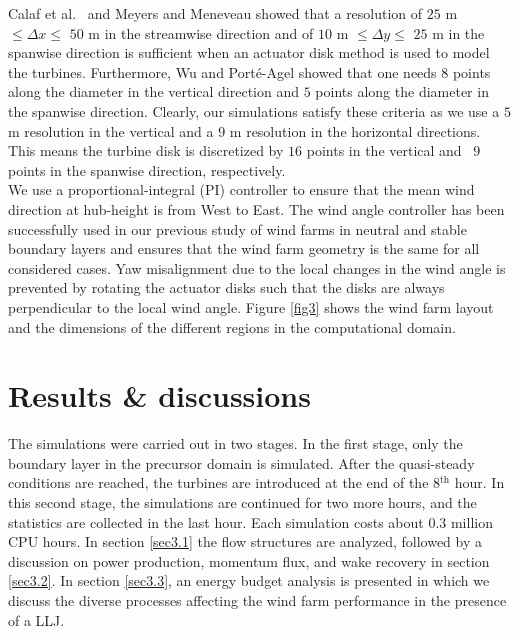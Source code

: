 \documentclass[%
 aip,
 amsmath,amssymb,
reprint,
twocolumn,%
author-numerical,%
]{revtex4-1}
\begin{document}
\indent Calaf et al.\ \cite{cal10} and Meyers and Meneveau \cite{mey13} showed that a resolution of $25$ m $\leq \Delta{x} \leq$ $50$ m in the streamwise direction and of $10$ m $\leq \Delta{y}\leq$ $25$ m in the spanwise direction is sufficient when an actuator disk method is used to model the turbines. Furthermore, Wu and Port\'e-Agel \cite{wu11} showed that one needs $8$ points along the diameter in the vertical direction and $5$ points along the diameter in the spanwise direction. Clearly, our simulations satisfy these criteria as we use a $5$ m resolution in the vertical and a $9$ m resolution in the horizontal directions. This means the turbine disk is discretized by $16$ points in the vertical and \ $9$ points in the spanwise direction, respectively.\\
\indent We use a proportional-integral (PI) controller\cite{all15} to ensure that the mean wind direction at hub-height is from West to East. The wind angle controller has been successfully used in our previous study of wind farms in neutral and stable boundary layers \cite{nag19} and ensures that the wind farm geometry is the same for all considered cases. Yaw misalignment due to the local changes in the wind angle is prevented by rotating the actuator disks such that the disks are always perpendicular to the local wind angle. Figure \ref{fig3} shows the wind farm layout and the dimensions of the different regions in the computational domain.

\section{Results \& discussions}\label{sec3}
The simulations were carried out in two stages. In the first stage, only the boundary layer in the precursor domain is simulated. After the quasi-steady conditions are reached, the turbines are introduced at the end of the 8$^\text{th}$ hour. In this second stage, the simulations are continued for two more hours, and the statistics are collected in the last hour. {\color{black} Each simulation costs about 0.3 million CPU hours.}  In section \ref{sec3.1} the flow structures are analyzed, followed by a discussion on power production, momentum flux, and wake recovery in section \ref{sec3.2}. In section \ref{sec3.3}, an energy budget analysis is presented in which we discuss the diverse processes affecting the wind farm performance in the presence of a LLJ.
\end{document}
